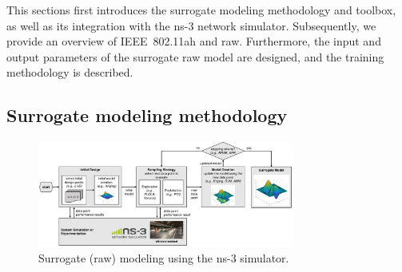 




This sections first introduces the surrogate modeling methodology 
and toolbox, as well as its integration with the ns-3 network
simulator. Subsequently, we provide an overview of  IEEE~802.11ah and \gls{raw}. Furthermore, the input and output parameters of the surrogate \gls{raw} model are designed, and the training methodology is described. 


\subsection{Surrogate modeling methodology}


\begin{figure}[t]
  \centering
  \includegraphics[width=0.75\textwidth]{figures/surrogate_modeling_approach}
  \caption{Surrogate (\gls{raw}) modeling using the ns-3 simulator. \label{fig:sumo-ns3}}
\end{figure}

